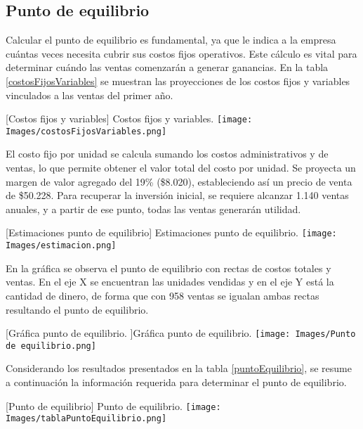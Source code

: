 \subsection{Punto de equilibrio}

Calcular el punto de equilibrio es fundamental, ya que le indica a la empresa cuántas veces necesita cubrir sus costos fijos operativos. Este cálculo es vital para determinar cuándo las ventas comenzarán a generar ganancias. En la tabla \ref{costosFijosVariables} se muestran las proyecciones de los costos fijos y variables vinculados a las ventas del primer año.

\vspace{2mm}
\begin{minipage}{0.9\textwidth}
\centering
{}[{Costos fijos y variables}]{ Costos fijos y variables. }
\label{costosFijosVariables}
\texttt{[image: Images/costosFijosVariables.png]}
\end{minipage}

El costo fijo por unidad se calcula sumando los costos administrativos y de ventas, lo que permite obtener el valor total del costo por unidad. Se proyecta un margen de valor agregado del 19\% (\$8.020), estableciendo así un precio de venta de \$50.228. Para recuperar la inversión inicial, se requiere alcanzar 1.140 ventas anuales, y a partir de ese punto, todas las ventas generarán utilidad.

\vspace{2mm}
\begin{minipage}{0.9\textwidth}
\centering
{}[{Estimaciones punto de equilibrio}]{ Estimaciones punto de equilibrio. }
\label{calculosPuntoEquilirbio}
\texttt{[image: Images/estimacion.png]}
\end{minipage}

En la gráfica se observa el punto de equilibrio con rectas de costos totales y ventas. En el eje X se encuentran las unidades vendidas y en el eje Y está la cantidad de dinero, de forma que con 958 ventas se igualan ambas rectas resultando el punto de equilibrio.

\vspace{2mm}
\begin{minipage}{0.9\textwidth}
\centering
{}[{Gráfica punto de equilibrio. }]{Gráfica punto de equilibrio. }
\label{graficaEquilibrio}
\texttt{[image: Images/Punto de equilibrio.png]}
\end{minipage}

Considerando los resultados presentados en la tabla \ref{puntoEquilibrio}, se resume a continuación la información requerida para determinar el punto de equilibrio.

\vspace{2mm}
\begin{minipage}{0.9\textwidth}
\centering
{}[{Punto de equilibrio}]{ Punto de equilibrio. }
\label{puntoEquilibrio}
\texttt{[image: Images/tablaPuntoEquilibrio.png]}
\end{minipage}